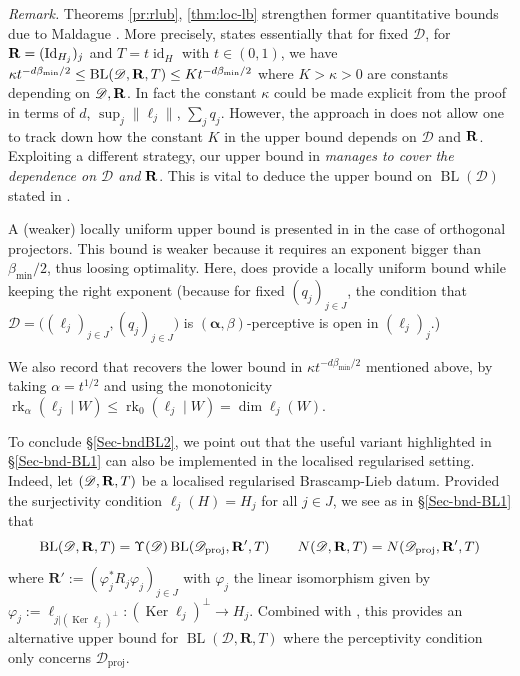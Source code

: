 \documentclass[a4paper,english]{amsart}
\theoremstyle{definition}
\newenvironment{remark}{\par\medskip \noindent \textit{Remark.} \rmfamily}{\medskip}
\newcommand{\comW}[1]{\marginpar{{\color{blue} #1}}}
\newcommand{\bba}{\boldsymbol{\alpha}}
\newcommand{\1}{\mathbbm{1}}
\newcommand{\bbR}{{\bf{R}}}
\newcommand{\sD} {{\mathscr D}}
\newcommand{\bR}{\mathbf{R}}
\DeclareMathOperator{\id}{id}
\DeclareMathOperator{\rk}{rk}
\DeclareMathOperator{\Id}{Id}
\DeclareMathOperator{\Ker}{Ker}
\DeclareMathOperator{\BL}{BL}
\begin{document}
\begin{remark}
Theorems \ref{pr:rlub}, \ref{thm:loc-lb} strengthen former quantitative bounds due to Maldague \cite{Maldague22}. More precisely, \cite[Theorem 1]{Maldague22} states essentially
that for fixed $\sD$, for $\bbR=(\Id_{H_j})_{j}$ and $T = t \id_H$ with $t\in (0,1)$, we have  $\kappa t^{-d \beta_{\min} /2}\leq \BL(\sD, \bbR, T) \leq K t^{- d\beta_{\min} /2} $ where $K>\kappa>0$ are constants depending on $\sD, \bbR$. In fact the constant $\kappa$ could be made explicit from the proof in terms of  $d$, $\sup_{j}\|\ell_{j}\|$, $\sum_{j} q_{j}$.
However, the approach in \cite{Maldague22} does not allow one to track down how the constant $K$ in the upper bound depends on $\sD$ and $\bbR$. Exploiting a different strategy, our upper bound in \emph{  manages to cover the dependence on $\sD$ and $\bbR$}. This is vital to deduce the upper bound on $\BL(\sD)$ stated in  .

A (weaker) locally uniform upper bound is presented in \cite[Theorem 3]{Maldague22} in the case of orthogonal projectors. This bound is weaker because it requires an exponent bigger than $\beta_{\min}/2$, thus loosing optimality. Here,   does provide a locally uniform bound while keeping the right exponent (because for fixed $(q_j)_{j \in J}$, the  condition that  $\sD = \bigl((\ell_j)_{j \in J}, (q_j)_{j \in J}\bigr)$ is $(\bba,\beta)$-perceptive is  open  in $(\ell_j)_j$.)%

We also record that   recovers the lower bound in $\kappa t^{-d \beta_{\min} /2}$ mentioned above, by  taking $\alpha = t^{1/2}$ and using the monotonicity $\rk_\alpha(\ell_j \mid W) \leq \rk_0(\ell_j \mid W) = \dim \ell_j(W)$.
\end{remark}

\bigskip
{}
To conclude \S\ref{Sec-bndBL2}, we point out that the useful variant highlighted in \S\ref{Sec-bnd-BL1} can also be implemented in the  localised regularised setting.  Indeed,  let $(\sD,\bbR, T)$ be a  localised regularised Brascamp-Lieb datum. Provided the surjectivity condition $\ell_{j}(H)=H_{j}$ for all $j\in J$, we see as in \S\ref{Sec-bnd-BL1} that
$$\BL(\sD, \bR, T)= \Upsilon(\sD) \BL(\sD_{\mathrm{proj}}, \bR', T)  \,\,\,\,\, \,\,\,\,\, \,\,N(\sD, \bbR, T)=N(\sD_{\mathrm{proj}}, \bbR', T)$$
where $\bR':=(\varphi_{j}^*  R_{j} \varphi_{j})_{j\in J}$ with $\varphi_{j}$ the linear isomorphism given by $\varphi_{j}:=\ell_{j|(\Ker \ell_{j})^\perp} : (\Ker \ell_{j})^\perp\to H_{j}$.
Combined with , this provides an alternative upper bound for $\BL(\sD, \bR, T)$ where the perceptivity condition only concerns $\sD_{\mathrm{proj}}$.
\end{document}
